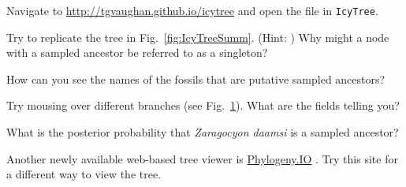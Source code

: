 {\begin{framed}
Navigate to \url{http://tgvaughan.github.io/icytree} and open the file  in {\tt IcyTree}.

\QUEST Try to replicate the tree in Fig.\ \ref{fig:IcyTreeSumm}. (Hint: )
Why might a node with a sampled ancestor be referred to as a singleton? 

\QUEST How can you see the names of the fossils that are putative sampled ancestors?

\QUEST Try mousing over different branches (see Fig.\ \ref{fig:IcyTreeScreenshort}).
What are the fields telling you?

\QUEST What is the posterior probability that \textit{Zaragocyon daamsi} is a sampled ancestor?

Another newly available web-based tree viewer is \href{http://phylogeny.io/}{Phylogeny.IO} \citep{Jovanovic2016}. 
Try this site for a different way to view the tree.
\end{framed}}





\begin{figure}[h!]
\label{fig:IcyTreeScreenshort}
\end{figure}







